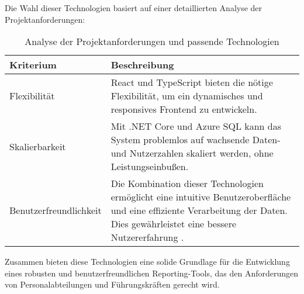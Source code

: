 Die Wahl dieser Technologien basiert auf einer detaillierten Analyse der Projektanforderungen:
\begin{table}[h!]
\centering
\caption{Analyse der Projektanforderungen und passende Technologien}
\label{tab:technologien_eigenschaften}
\begin{tabularx}{\textwidth}{|p{3.5cm}|X|}
\hline
\textbf{Kriterium}              & \textbf{Beschreibung}                                                                                                   \\ \hline
Flexibilität                   & React und TypeScript bieten die nötige Flexibilität, um ein dynamisches und responsives Frontend zu entwickeln.           \\ \hline
Skalierbarkeit                 & Mit .NET Core und Azure SQL kann das System problemlos auf wachsende Daten- und Nutzerzahlen skaliert werden, ohne Leistungseinbußen.                        \\ \hline
Benutzerfreundlichkeit         & Die Kombination dieser Technologien ermöglicht eine intuitive Benutzeroberfläche und eine effiziente Verarbeitung der Daten. Dies gewährleistet eine bessere Nutzererfahrung \cite{stefanov2021react, gammon2020typescript, adler2021aspnetcore, proseware2018sql}. \\ \hline 
\end{tabularx}
\end{table}

\noindent Zusammen bieten diese Technologien eine solide Grundlage für die Entwicklung eines robusten und benutzerfreundlichen Reporting-Tools, das den Anforderungen von Personalabteilungen und Führungskräften gerecht wird.


